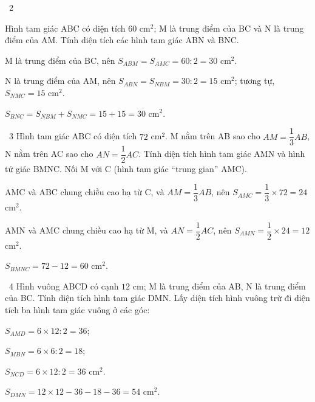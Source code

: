 \begin{exbox}{\ExWord\ 2}
\begin{minipage}[t]{0.6\linewidth}
Hình tam giác ABC có diện tích $60$ cm$^2$; M là trung điểm của BC và N là trung điểm của AM. Tính diện tích các hình tam giác ABN và BNC.
\end{minipage}\hfill
\begin{minipage}[t]{0.36\linewidth}\vspace{0pt}\centering
{}
\end{minipage}
\guide
M là trung điểm của BC, nên $S_{ABM}=S_{AMC}=60:2=30$ cm$^2$.\par
N là trung điểm của AM, nên $S_{ABN}=S_{NBM}=30:2=15$ cm$^2$; tương tự, $S_{NMC}=15$ cm$^2$.\par
$S_{BNC}=S_{NBM}+S_{NMC}=15+15=30$ cm$^2$.
\end{exbox}
\gap
\begin{exbox}{\ExWord\ 3}
Hình tam giác ABC có diện tích $72$ cm$^2$. M nằm trên AB sao cho $AM=\dfrac13AB$, N nằm trên AC sao cho $AN=\dfrac12AC$. Tính diện tích hình tam giác AMN và hình tứ giác BMNC.
\guide
Nối M với C (hình tam giác ``trung gian'' AMC).\par
AMC và ABC chung chiều cao hạ từ C, và $AM=\dfrac13AB$, nên $S_{AMC}=\dfrac13\times72=24$ cm$^2$.\par
AMN và AMC chung chiều cao hạ từ M, và $AN=\dfrac12AC$, nên $S_{AMN}=\dfrac12\times24=12$ cm$^2$.\par
$S_{BMNC}=72-12=60$ cm$^2$.
\end{exbox}
\gap
\begin{exbox}{\ExWord\ 4}
Hình vuông ABCD có cạnh $12$ cm; M là trung điểm của AB, N là trung điểm của BC. Tính diện tích hình tam giác DMN.
\guide
Lấy diện tích hình vuông trừ đi diện tích ba hình tam giác vuông ở các góc:\par
$S_{AMD}=6\times12:2=36$;\par $S_{MBN}=6\times6:2=18$;\par $S_{NCD}=6\times12:2=36$ cm$^2$.\par
$S_{DMN}=12\times12-36-18-36=54$ cm$^2$.
\end{exbox}

